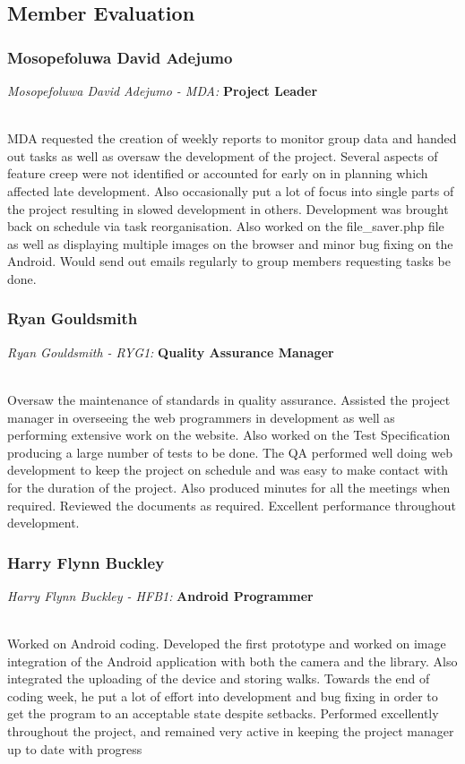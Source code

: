 \documentclass[12pt, portrait]{article}
\begin{document}
\newpage
\subsection{Member Evaluation}
\subsubsection{Mosopefoluwa David Adejumo}
\centerline{\emph{Mosopefoluwa David Adejumo - MDA:} \textbf{Project Leader}}
~\\
MDA requested the creation of weekly reports to monitor group data and handed out tasks as well as oversaw the development of the project. Several aspects of feature creep were not identified or accounted for early on in planning which affected late development. Also occasionally put a lot of focus into single parts of the project resulting in slowed development in others. Development was brought back on schedule via task reorganisation. Also worked on the file\_saver.php file as well as displaying multiple images on the browser and minor bug fixing on the Android. Would send out emails regularly to group members requesting tasks be done. 
\subsubsection{Ryan Gouldsmith}
\centerline{\emph{Ryan Gouldsmith - RYG1:}\textbf{ Quality Assurance Manager}}
~\\
Oversaw the maintenance of standards in quality assurance. Assisted the project manager in overseeing the web programmers in development as well as performing extensive work on the website. Also worked on the Test Specification producing a large number of tests to be done. The QA performed well doing web development to keep the project on schedule and was easy to make contact with for the duration of the project. Also produced minutes for all the meetings when required. Reviewed the documents as required. Excellent performance throughout development.

\subsubsection{Harry Flynn Buckley}
\centerline{\emph{Harry Flynn Buckley - HFB1:}\textbf{ Android Programmer}}
~\\
Worked on Android coding. Developed the first prototype and worked on image integration of the Android application with both the camera and the library. Also integrated the uploading of the device and storing walks. Towards the end of coding week, he put a lot of effort into development and bug fixing in order to get the program to an acceptable state despite setbacks. Performed excellently throughout the project, and remained very active in keeping the project manager up to date with progress
\end{document}

